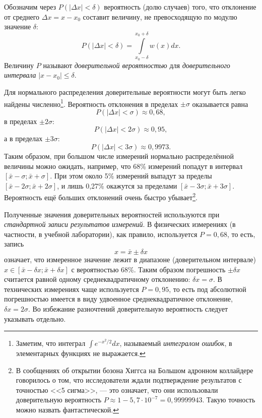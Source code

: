 \documentclass[10pt]{article}
\begin{document}
Обозначим через $P\!\left(\left|\Delta x\right|<\delta\right)$ вероятность
(долю случаев) того, что отклонение от среднего $\Delta x=x-x_{0}$
составит величину, не превосходящую по модулю значение $\delta$:
\[
P\left(\left|\Delta x\right|<\delta\right)=\int\limits _{x_{0}-\delta}^{x_{0}+\delta}w\!\left(x\right)dx.
\]
Величину $P$ называют \emph{доверительной вероятностью} для \emph{доверительного
интервала} $\left|x-x_{0}\right|\le\delta$. 

Для нормального распределения доверительные вероятности могут быть
легко найдены численно\footnote{Заметим, что интеграл $\int e^{-x^{2}/2}dx$, называемый \emph{интегралом
ошибок}, в элементарных функциях не выражается.}. Вероятность отклонения в пределах $\pm\sigma$ оказывается равна
\[
P\!\left(\left|\Delta x\right|<\sigma\right)\approx0{,}68,
\]
в пределах $\pm2\sigma$:
\[
P\!\left(\left|\Delta x\right|<2\sigma\right)\approx0{,}95,
\]
а в пределах $\pm3\sigma$:
\[
P\left(\left|\Delta x\right|<3\sigma\right)\approx0{,}9973.
\]
Таким образом, при большом числе измерений нормально распределённой
величины можно ожидать, например, что 68\% измерений попадут в интервал
$\left[\bar{x}-\sigma;\bar{x}+\sigma\right]$. При этом около 5\%
измерений выпадут за пределы $\left[\bar{x}-2\sigma;\bar{x}+2\sigma\right]$,
и лишь 0,27\% окажутся за пределами $\left[\bar{x}-3\sigma;\bar{x}+3\sigma\right]$.
Вероятность ещё больших отклонений очень быстро убывает\footnote{В сообщениях об открытии бозона Хиггса на Большом адронном коллайдере
говорилось о том, что исследователи ждали подтверждение результатов
с точностью <<5 сигма>>, ---
это означает, что они использовали доверительную вероятность $P\approx1-5{,}7\cdot10^{-7}=0{,}99999943$.
Такую точность можно назвать фантастической.}.

Полученные значения доверительных вероятностей используются при \emph{стандартной
записи результатов измерений}. В физических измерениях (в частности,
в учебной лаборатории), как правило, используется $P=0{,}68$, то
есть, запись 
\[
x=\bar{x}\pm\delta x
\]
означает, что измеренное значение лежит в диапазоне (доверительном
интервале) $x\in\left[\bar{x}-\delta x;\bar{x}+\delta x\right]$ с
вероятностью 68\%. Таким образом погрешность $\pm\delta x$ считается
равной одному среднеквадратичному отклонению: $\delta x=\sigma$.
В технических измерениях чаще используется $P=0{,}95$, то есть под
абсолютной погрешностью имеется в виду удвоенное среднеквадратичное
отклонение, $\delta x=2\sigma$. Во избежание разночтений доверительную
вероятность следует указывать отдельно.
\end{document}

